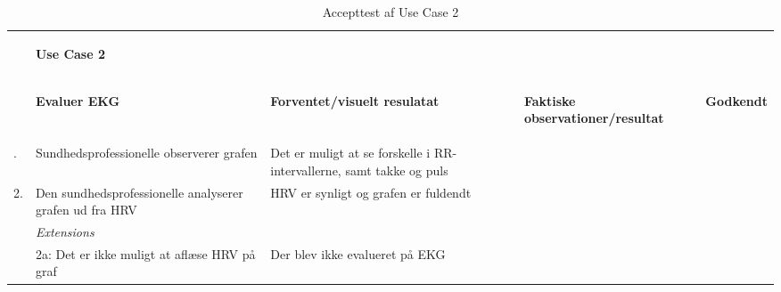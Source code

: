 \begin{table}[H]
	\begin{tabularx}{\textwidth}{l X X X c}
	\toprule
	~ & \begin{large}\textbf{Use Case 2}\end{large} & ~ & ~ & ~\\
	~ & \begin{large}\textbf{Evaluer EKG} \end{large}
	& \begin{large}\textbf{Forventet/visuelt resulatat}\end{large}
	& \begin{large}\textbf{Faktiske observationer/resultat}\end{large}
	& \begin{large}\textbf{Godkendt}\end{large}
	\\			\midrule \addlinespace[3mm]
					1.	& Sundhedsprofessionelle observerer grafen
						& Det er muligt at se forskelle i RR-intervallerne, samt takke og puls
						& ~
						& %
						\\ \midrule
					2. 	& Den sundhedsprofessionelle analyserer grafen ud fra 		  HRV						
						& HRV er synligt og grafen er fuldendt 
						& ~
						& %
						\\ \midrule
     				~	& \textit{Extensions}
     					&	~
     					&	~		\\ \midrule
     				~ 	&	2a: Det er ikke muligt at aflæse HRV på graf
     					&   Der blev ikke evalueret på EKG 

     					&  %
     					    \\ 

		
	
	\bottomrule	
	\end{tabularx}
	\caption{Accepttest af Use Case 2}
	\label{tab:AT_UC2}
\end{table}


